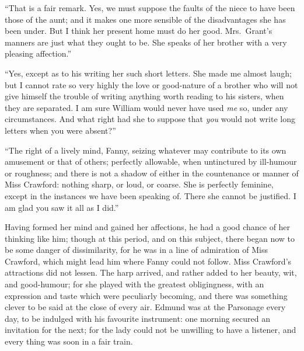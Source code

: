 ``That is a fair remark.  Yes, we must suppose the faults
of the niece to have been those of the aunt; and it makes
one more sensible of the disadvantages she has been under.
But I think her present home must do her good.
Mrs.\ Grant's manners are just what they ought to be.
She speaks of her brother with a very pleasing affection.''

``Yes, except as to his writing her such short letters.
She made me almost laugh; but I cannot rate so very highly
the love or good-nature of a brother who will not give
himself the trouble of writing anything worth reading
to his sisters, when they are separated.  I am sure William
would never have used \emph{me} so, under any circumstances.
And what right had she to suppose that \emph{you} would not write
long letters when you were absent?''

``The right of a lively mind, Fanny, seizing whatever
may contribute to its own amusement or that of others;
perfectly allowable, when untinctured by ill-humour
or roughness; and there is not a shadow of either in the
countenance or manner of Miss Crawford:  nothing sharp,
or loud, or coarse.  She is perfectly feminine, except in
the instances we have been speaking of.  There she cannot
be justified.  I am glad you saw it all as I did.''

Having formed her mind and gained her affections, he had a
good chance of her thinking like him; though at this period,
and on this subject, there began now to be some danger
of dissimilarity, for he was in a line of admiration
of Miss Crawford, which might lead him where Fanny could
not follow.  Miss Crawford's attractions did not lessen.
The harp arrived, and rather added to her beauty, wit,
and good-humour; for she played with the greatest obligingness,
with an expression and taste which were peculiarly becoming,
and there was something clever to be said at the close
of every air.  Edmund was at the Parsonage every day,
to be indulged with his favourite instrument:
one morning secured an invitation for the next;
for the lady could not be unwilling to have a listener,
and every thing was soon in a fair train.

